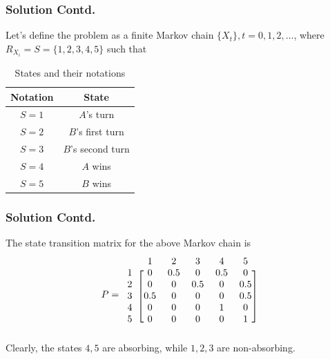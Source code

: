 \documentclass{beamer}
\begin{document}
\begin{frame}
\frametitle{Solution Contd.}
Let's define the problem as a finite Markov chain $\{X_{t}\},t=0,1,2,\dots$, where $R_{X_{i}}=S=\{1,2,3,4,5\}$
such that
\begin{table}[h!]
\centering
\caption{States and their notations}
\label{table:1}
\begin{tabular}{|c|c|}
    \hline
    Notation & State \\
    \hline
    $S=1$ & $A$'s turn\\[1ex]
    \hline
    $S=2$ & $B$'s first turn\\[1ex]
    \hline
    $S=3$ & $B$'s second turn\\[1ex]
    \hline
    $S=4$ & $A$ wins\\[1ex]
    \hline
    $S=5$ & $B$ wins\\[1ex]
    \hline
\end{tabular}
\end{table}
\end{frame}

\begin{frame}
\frametitle{Solution Contd.}
The state transition matrix for the above Markov chain is
\begin{align}
\label{eq:p}
    P=\begin{blockarray}{cccccc}
&1 & 2 & 3 & 4 & 5 \\
\begin{block}{c[ccccc]}
  1 & 0 & 0.5 & 0 & 0.5 & 0 \\
  2 & 0 & 0 & 0.5 & 0 & 0.5 \\
  3 & 0.5 & 0 & 0 & 0 & 0.5 \\
  4 & 0 & 0 & 0 & 1 & 0 \\
  5 & 0 & 0 & 0 & 0 & 1 \\
\end{block}
\end{blockarray}
\end{align}
Clearly, the states $4,5$ are absorbing, while $1,2,3$ are non-absorbing.
\end{frame}
\end{document}
